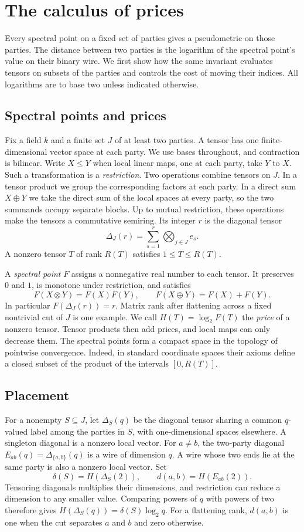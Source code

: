 \section{The calculus of prices}\label{sec:spectra}
Every spectral point on a fixed set of parties gives a pseudometric on
those parties. The distance between two parties is the logarithm of the
spectral point's value on their binary wire. We first show how the same invariant evaluates tensors on subsets of the
parties and controls the cost of moving their indices. All logarithms are to
base two unless indicated otherwise.

\subsection{Spectral points and prices}
Fix a field $k$ and a finite set $J$ of at least two parties. A tensor has
one finite-dimensional vector space at each party. We use bases throughout,
and contraction is bilinear. Write $X\le Y$ when local linear maps, one at
each party, take $Y$ to $X$. Such a transformation is a \emph{restriction}.
Two operations combine tensors on $J$. In a tensor product we group the
corresponding factors at each party. In a direct sum $X\oplus Y$ we take the
direct sum of the local spaces at every party, so the two summands occupy
separate blocks. Up to mutual restriction, these operations make the tensors
a commutative semiring. Its integer $r$ is the diagonal tensor
\[
                 \Delta_J(r)=\sum_{s=1}^r\bigotimes_{j\in J}e_s.
\]
A nonzero tensor $T$ of rank $R(T)$ satisfies $1\le T\le R(T)$.

A \emph{spectral point} $F$ assigns a nonnegative real number to each tensor.
It preserves $0$ and $1$, is monotone under restriction, and satisfies
\[
       F(X\otimes Y)=F(X)F(Y),\qquad F(X\oplus Y)=F(X)+F(Y).
\]
In particular $F(\Delta_J(r))=r$. Matrix rank after flattening across a
fixed nontrivial cut of $J$ is one example. We call $H(T)=\log_2 F(T)$
the \emph{price} of a nonzero tensor. Tensor products then add prices,
and local maps can only decrease them. The spectral points form a compact
space in the topology of pointwise convergence. Indeed, in standard
coordinate spaces their axioms define a closed subset of the product of
the intervals $[0,R(T)]$.

\subsection{Placement}
For a nonempty $S\subseteq J$, let $\Delta_S(q)$ be the diagonal tensor
sharing a common $q$-valued label among the parties in $S$, with
one-dimensional spaces elsewhere. A singleton diagonal is a nonzero local
vector. For $a\ne b$, the two-party diagonal $E_{ab}(q)=\Delta_{\{a,b\}}(q)$
is a wire of dimension $q$. A wire whose two ends lie at the same party
is also a nonzero local vector. Set
\[
     \delta(S)=H(\Delta_S(2)),\qquad d(a,b)=H(E_{ab}(2)).
\]
Tensoring diagonals multiplies their dimensions, and restriction can
reduce a dimension to any smaller value. Comparing powers of $q$ with
powers of two therefore gives $H(\Delta_S(q))=\delta(S)\log_2 q$.
For a flattening rank, $d(a,b)$ is one when the cut separates $a$ and $b$
and zero otherwise.

